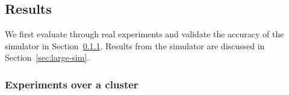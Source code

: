 \subsection{Results}

%

We first evaluate \name through real experiments and validate the accuracy of the simulator in Section~\ref{sec:eval-cluster}. Results from the simulator are discussed in Section~\ref{sec:large-sim}.


\subsubsection{Experiments over a cluster}
\label{sec:eval-cluster}

